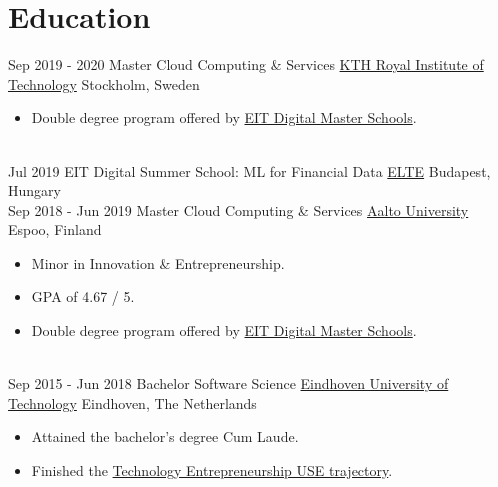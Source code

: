 \documentclass[a4paper]{twentysecondcv} %
\begin{document}
\makeprofile %

\section{Education}

\begin{twenty} %
    \twentyitem
    	{Sep 2019 - }
        {2020}
        {Master Cloud Computing \& Services}
        {\href{https://kth.se/en}{KTH Royal Institute of Technology}}
        {Stockholm, Sweden}
        {
        \begin{itemize}
            \item Double degree program offered by \href{https://masterschool.eitdigital.eu/}{EIT Digital Master Schools}.
        \end{itemize}
        }
    \\
	\twentyitem
    	{Jul 2019}
		{}
        {EIT Digital Summer School: ML for Financial Data}
        {\href{https://www.elte.hu/en/}{ELTE}}
        {Budapest, Hungary}
        {
    	}
    \\
	\twentyitem
    	{Sep 2018 - }
        {Jun 2019}
        {Master Cloud Computing \& Services}
        {\href{https://www.aalto.fi/en}{Aalto University}}
        {Espoo, Finland}
        {
        \begin{itemize}
            \item Minor in Innovation \& Entrepreneurship.
            \item GPA of 4.67 / 5.
            \item Double degree program offered by \href{https://masterschool.eitdigital.eu/}{EIT Digital Master Schools}.
        \end{itemize}
        }
    \\
    \twentyitem
    	{Sep 2015 - }
        {Jun 2018}
        {Bachelor Software Science}
        {\href{https://tue.nl/}{Eindhoven University of Technology}}
        {Eindhoven, The Netherlands}
        {
       	\begin{itemize}
   			\item Attained the bachelor's degree Cum Laude.
            \item Finished the \href{https://educationguide.tue.nl/programs/bachelor-college/use-learning-trajectory/technology-entrepreneurship/}{Technology Entrepreneurship USE trajectory}.

\end{itemize}}
\end{twenty}
\end{document}
